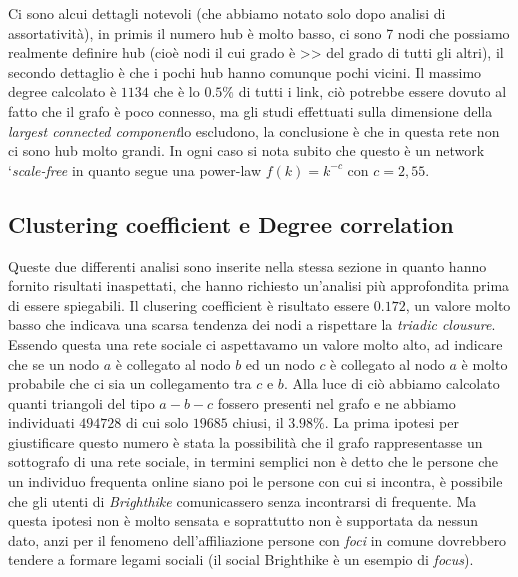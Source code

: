 \documentclass[a4paper]{article}
\newcommand{\lcc}{\textit{largest connected component}}
\begin{document}
Ci sono alcui dettagli notevoli (che abbiamo notato solo dopo analisi di assortatività), in primis il numero hub è molto basso, ci sono 7 nodi che possiamo realmente definire hub (cioè nodi il cui grado è >> del grado di tutti gli altri), il secondo dettaglio è che i pochi hub hanno comunque pochi vicini.
Il massimo degree calcolato è $1134$ che è lo $0.5\%$ di tutti i link, ciò potrebbe essere dovuto al fatto che il grafo è poco connesso, ma gli studi effettuati sulla dimensione della \lcc lo escludono, la conclusione è che in questa rete non ci sono hub molto grandi.
In ogni caso si nota subito che questo è un network `\textit{scale-free} in quanto segue una power-law $f(k) = k^{-c}$ con $c= 2,55$.
\subsection{Clustering coefficient e Degree correlation}
Queste due differenti analisi sono inserite nella stessa sezione in quanto hanno fornito risultati inaspettati, che hanno richiesto un'analisi più approfondita prima di essere spiegabili.
Il clusering coefficient è risultato essere $0.172$, un valore molto basso che indicava una scarsa tendenza dei nodi a rispettare la \textit{triadic clousure}.
Essendo questa una rete sociale ci aspettavamo un valore molto alto, ad indicare che se un nodo $a$ è collegato al nodo $b$ ed un nodo $c$ è collegato al nodo $a$ è molto probabile che ci sia un collegamento tra $c$ e $b$.
Alla luce di ciò abbiamo calcolato quanti triangoli del tipo $a - b - c$ fossero presenti nel grafo e ne abbiamo individuati $494728$ di cui solo $19685$ chiusi, il $3.98\%$.
La prima ipotesi per giustificare questo numero è stata la possibilità che il grafo rappresentasse un sottografo di una rete sociale, in termini semplici non è detto che le persone che un individuo frequenta online siano poi le persone con cui si incontra, è possibile che gli utenti di \textit{Brighthike} comunicassero senza incontrarsi di frequente.
Ma questa ipotesi non è molto sensata e soprattutto non è supportata da nessun dato, anzi per il fenomeno dell'affiliazione persone con \textit{foci} in comune dovrebbero tendere a formare legami sociali (il social Brighthike è un esempio di \textit{focus}).
\end{document}
